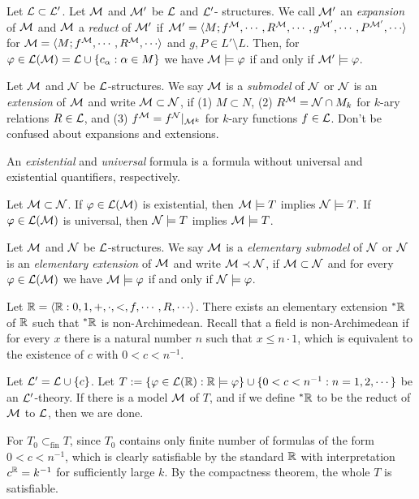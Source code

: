 \documentclass{../../small}
\begin{document}
Let $\mathcal{L}\subset\mathcal{L}'$.
Let $\mathcal{M}$ and $\mathcal{M}'$ be $\mathcal{L}$ and $\mathcal{L}'$- structures.
We call $\mathcal{M}'$ an \emph{expansion} of $\mathcal{M}$ and $\mathcal{M}$ a \emph{reduct} of $\mathcal{M}'$ if $\cM'=\<M;f^\cM,\cdots,R^\cM,\cdots,g^{\cM'},\cdots,P^{\cM'},\cdots\>$ for $\cM=\<M;f^\cM,\cdots,R^\cM,\cdots\>$ and $g,P\in L'\setminus L$.
Then, for $\varphi\in\mathcal{L}(\mathcal{M})=\mathcal{L}\cup\{c_\alpha:\alpha\in M\}$ we have $\mathcal{M}\models\varphi$ if and only if $\mathcal{M}'\models\varphi$.

Let $\mathcal{M}$ and $\mathcal{N}$ be $\mathcal{L}$-structures.
We say $\mathcal{M}$ is a \emph{submodel} of $\mathcal{N}$ or $\mathcal{N}$ is an \emph{extension} of $\mathcal{M}$ and write $\mathcal{M}\subset\mathcal{N}$, if (1) $M\subset N$, (2) $R^{\mathcal{M}}=\mathcal{N}\cap M_k$ for $k$-ary relations $R\in\mathcal{L}$, and (3) $f^{\mathcal{M}}=f^{\mathcal{N}}|_{\mathcal{M}^k}$ for $k$-ary functions $f\in\mathcal{L}$.
Don't be confused about expansions and extensions.

\begin{defn*}
An \emph{existential} and \emph{universal} formula is a formula without universal and existential quantifiers, respectively.
\end{defn*}
\begin{prop*}
Let $\mathcal{M}\subset\mathcal{N}$.
If $\varphi\in\mathcal{L}(\mathcal{M})$ is existential, then $\mathcal{M}\models T$ implies $\mathcal{N}\models T$.
If $\varphi\in\mathcal{L}(\mathcal{M})$ is universal, then $\mathcal{N}\models T$ implies $\mathcal{M}\models T$.
\end{prop*}
\begin{defn*}
Let $\mathcal{M}$ and $\mathcal{N}$ be $\mathcal{L}$-structures.
We say $\mathcal{M}$ is a \emph{elementary submodel} of $\mathcal{N}$ or $\mathcal{N}$ is an \emph{elementary extension} of $\mathcal{M}$ and write $\mathcal{M}\prec\mathcal{N}$, if $\mathcal{M}\subset\mathcal{N}$ and for every $\varphi\in\mathcal{L}(\mathcal{M})$ we have $\mathcal{M}\models\varphi$ if and only if $\mathcal{N}\models\varphi$.
\end{defn*}
\begin{ex*}
Let $\R=\<\R:0,1,+,\cdot,<,f,\cdots,R,\cdots\>$.
There exists an elementary extension $^*\mathbb{R}$ of $\mathbb{R}$ such that $^*\mathbb{R}$ is non-Archimedean.
Recall that a field is non-Archimedean if for every $x$ there is a natural number $n$ such that $x\le n\cdot1$, which is equivalent to the existence of $c$ with $0<c<n^{-1}$.
\end{ex*}
\begin{pf}
Let $\mathcal{L}'=\mathcal{L}\cup\{c\}$.
Let $T:=\{\varphi\in\mathcal{L}(\mathbb{R}):\mathbb{R}\models\varphi\}\cup\{0<c<n^{-1}:n=1,2,\cdots\}$ be an $\mathcal{L}'$-theory.%
If there is a model $\mathcal{M}$ of $T$, and if we define $^*\mathbb{R}$ to be the reduct of $\mathcal{M}$ to $\mathcal{L}$, then we are done.

For $T_0\subset_{\mathrm{fin}}T$, since $T_0$ contains only finite number of formulas of the form $0<c<n^{-1}$, which is clearly satisfiable by the standard $\mathbb{R}$ with interpretation $c^{\mathbb{R}}=k^{-1}$ for sufficiently large $k$.
By the compactness theorem, the whole $T$ is satisfiable.
\end{pf}
\end{document}
